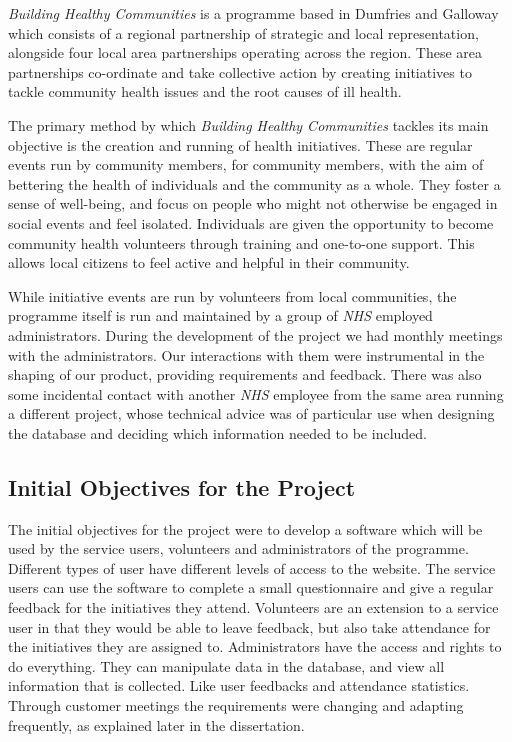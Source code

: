 \documentclass{l3proj}
\begin{document}
\textit{Building Healthy Communities} is a programme based in Dumfries and Galloway which consists of a regional partnership of strategic and local representation, alongside four local area partnerships operating across the region. These area partnerships co-ordinate and take collective action by creating initiatives to tackle community health issues and the root causes of ill health.

The primary method by which \textit{Building Healthy Communities} tackles its main objective is the creation and running of health initiatives. These are regular events run by community members, for community members, with the aim of bettering the health of individuals and the community as a whole. They foster a sense of well-being, and focus on people who might not otherwise be engaged in social events and feel isolated. Individuals are given the opportunity to become community health volunteers through training and one-to-one support. This allows local citizens to feel active and helpful in their community.

While initiative events are run by volunteers from local communities, the programme itself is run and maintained by a group of \textit{NHS} employed administrators. During the development of the project we had monthly meetings with the administrators. Our interactions with them were instrumental in the shaping of our product, providing requirements and feedback. There was also some incidental contact with another \textit{NHS} employee from the same area running a different project, whose technical advice was of particular use when designing the database and deciding which information needed to be included.

\subsection{Initial Objectives for the Project}
\label{sec:initial-objectives}

The initial objectives for the project were to develop a software which will be used by the service users, volunteers and administrators of the programme. Different types of user have different levels of access to the website. The service users can use the software to complete a small questionnaire and give a regular feedback for the initiatives they attend. Volunteers are an extension to a service user in that they would be able to leave feedback, but also take attendance for the initiatives they are assigned to. Administrators have the access and rights to do everything. They can manipulate data in the database, and view all information that is collected. Like user feedbacks and attendance statistics. Through customer meetings the requirements were changing and adapting frequently, as explained later in the dissertation.
\end{document}
